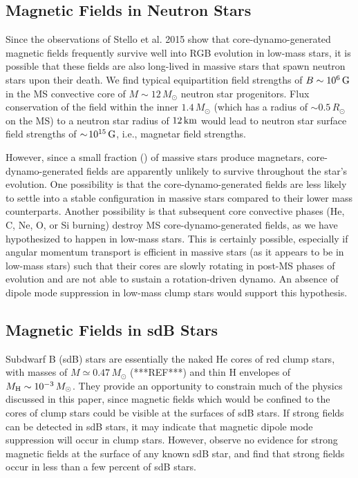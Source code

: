 \subsection{Magnetic Fields in Neutron Stars}

Since the observations of Stello et al. 2015 show that core-dynamo-generated magnetic fields frequently survive well into RGB evolution in low-mass stars, it is possible that these fields are also long-lived in massive stars that spawn neutron stars upon their death. We find typical equipartition field strengths of $B \sim 10^6 \, {\rm G}$ in the MS convective core of $M \sim 12 \, M_\odot$ neutron star progenitors. Flux conservation of the field within the inner $1.4 \, M_\odot$ (which has a radius of $\sim \! 0.5 \, R_\odot$ on the MS) to a neutron star radius of $12 \, {\rm km}$ would lead to neutron star surface field strengths of $\sim \! 10^{15} \, {\rm G}$, i.e., magnetar field strengths.  

However, since a small fraction (\cite{mereghetti_2015}) of massive stars produce magnetars, core-dynamo-generated fields are apparently unlikely to survive throughout the star's evolution. One possibility is that the core-dynamo-generated fields are less likely to settle into a stable configuration in massive stars compared to their lower mass counterparts. Another possibility is that subsequent core convective phases (He, C, Ne, O, or Si burning) destroy MS core-dynamo-generated fields, as we have hypothesized to happen in low-mass stars. This is certainly possible, especially if angular momentum transport is efficient in massive stars (as it appears to be in low-mass stars) such that their cores are slowly rotating in post-MS phases of evolution and are not able to sustain a rotation-driven dynamo. An absence of dipole mode suppression in low-mass clump stars would support this hypothesis. 


\subsection{Magnetic Fields in sdB Stars}

Subdwarf B (sdB) stars are essentially the naked He cores of red clump stars, with masses of $M \simeq 0.47 \, M_\odot$ (***REF***) and thin H envelopes of $M_{\rm H} \sim 10^{-3} \, M_\odot$. They provide an opportunity to constrain much of the physics discussed in this paper, since magnetic fields which would be confined to the cores of clump stars could be visible at the surfaces of sdB stars. If strong fields can be detected in sdB stars, it may indicate that magnetic dipole mode suppression will occur in clump stars. However, \cite{Landstreet_2012} observe no evidence for strong magnetic fields at the surface of any known sdB star, and find that strong fields occur in less than a few percent of sdB stars. 

